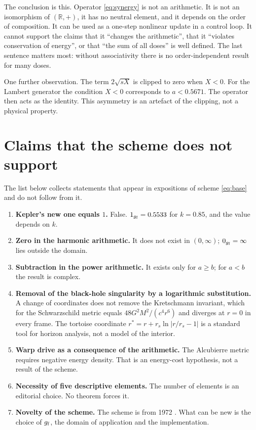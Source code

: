 \documentclass[11pt,a4paper]{article}
\begin{document}
The conclusion is this. Operator \eqref{eq:synergy} is not an arithmetic. It is
not an isomorphism of $(\mathbb{R},+)$, it has no neutral element, and it
depends on the order of composition. It can be used as a one-step nonlinear
update in a control loop. It cannot support the claims that it ``changes the
arithmetic'', that it ``violates conservation of energy'', or that ``the sum of
all doses'' is well defined. The last sentence matters most: without
associativity there is no order-independent result for many doses.

One further observation. The term $2\sqrt{sX}$ is clipped to zero when $X<0$.
For the Lambert generator the condition $X<0$ corresponds to $a<0.5671$. The
operator then acts as the identity. This asymmetry is an artefact of the
clipping, not a physical property.

\section{Claims that the scheme does not support}

The list below collects statements that appear in expositions of scheme
\eqref{eq:base} and do not follow from it.

\begin{enumerate}[leftmargin=1.6em]
  \item \textbf{Kepler's new one equals $1$.} False. $1_{g_{\mathrm{f}}}=0.5533$ for
        $k=0.85$, and the value depends on $k$.
  \item \textbf{Zero in the harmonic arithmetic.} It does not exist in
        $(0,\infty)$; $0_{g_{\mathrm{f}}}=\infty$ lies outside the domain.
  \item \textbf{Subtraction in the power arithmetic.} It exists only for
        $a\ge b$; for $a<b$ the result is complex.
  \item \textbf{Removal of the black-hole singularity by a logarithmic
        substitution.} A change of coordinates does not remove the Kretschmann
        invariant, which for the Schwarzschild metric equals
        $48G^{2}M^{2}/(c^{4}r^{6})$ and diverges at $r=0$ in every frame. The
        tortoise coordinate $r^{*}=r+r_{s}\ln|r/r_{s}-1|$ is a standard tool for
        horizon analysis, not a model of the interior.
  \item \textbf{Warp drive as a consequence of the arithmetic.} The Alcubierre
        metric requires negative energy density. That is an energy-cost
        hypothesis, not a result of the scheme.
  \item \textbf{Necessity of five descriptive elements.} The number of elements
        is an editorial choice. No theorem forces it.
  \item \textbf{Novelty of the scheme.} The scheme is from 1972
        \cite{grossman1972}. What can be new is the choice of $g_{\mathrm{f}}$, the domain
        of application and the implementation.
\end{enumerate}
\end{document}
